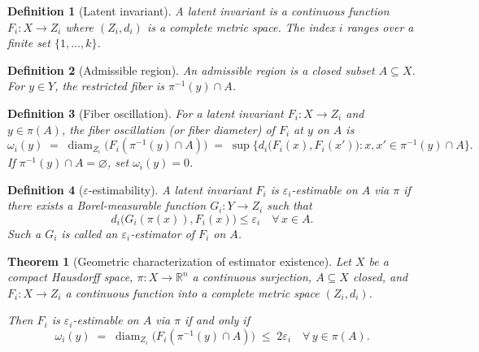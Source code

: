 \documentclass[11pt]{article}
\newtheorem{definition}{Definition}
\newtheorem{theorem}{Theorem}
\begin{document}
\begin{definition}[Latent invariant]
A \emph{latent invariant} is a continuous function $F_i\colon X\to Z_i$ where $(Z_i,d_i)$ is a complete metric space. The index $i$ ranges over a finite set $\{1,\ldots,k\}$.
\end{definition}

\begin{definition}[Admissible region]
An \emph{admissible region} is a closed subset $A\subseteq X$. For $y\in Y$, the \emph{restricted fiber} is $\pi^{-1}(y)\cap A$.
\end{definition}

\begin{definition}[Fiber oscillation]
For a latent invariant $F_i\colon X\to Z_i$ and $y\in\pi(A)$, the \emph{fiber oscillation} (or fiber diameter) of $F_i$ at $y$ on $A$ is
\[
\omega_i(y)\;=\;\operatorname{diam}_{Z_i}\!\bigl(F_i(\pi^{-1}(y)\cap A)\bigr)
\;=\;\sup\bigl\{d_i\bigl(F_i(x),F_i(x')\bigr): x,x'\in\pi^{-1}(y)\cap A\bigr\}.
\]
If $\pi^{-1}(y)\cap A=\varnothing$, set $\omega_i(y)=0$.
\end{definition}

\begin{definition}[$\varepsilon$-estimability]
A latent invariant $F_i$ is \emph{$\varepsilon_i$-estimable} on $A$ via $\pi$ if there exists a Borel-measurable function $G_i\colon Y\to Z_i$ such that
\begin{equation}\label{eq:estimability}
d_i\bigl(G_i(\pi(x)),F_i(x)\bigr)\leq\varepsilon_i\quad\forall\,x\in A.
\end{equation}
Such a $G_i$ is called an \emph{$\varepsilon_i$-estimator} of $F_i$ on $A$.
\end{definition}

\begin{theorem}[Geometric characterization of estimator existence]\label{thm:estimator}
Let $X$ be a compact Hausdorff space, $\pi\colon X\to\mathbb{R}^n$ a continuous surjection, $A\subseteq X$ closed, and $F_i\colon X\to Z_i$ a continuous function into a complete metric space $(Z_i,d_i)$.

Then $F_i$ is $\varepsilon_i$-estimable on $A$ via $\pi$ if and only if
\begin{equation}\label{eq:fiber-bound}
\omega_i(y)\;=\;\operatorname{diam}_{Z_i}\!\bigl(F_i(\pi^{-1}(y)\cap A)\bigr)\;\leq\;2\varepsilon_i\quad\forall\,y\in\pi(A).
\end{equation}
\end{theorem}
\end{document}
